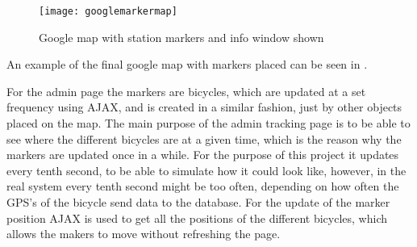 \begin{figure}[h]
	\centering
	\texttt{[image: googlemarkermap]}
	\caption{Google map with station markers and info window shown}
	\label{fig:googlemapmarkerinfowindow}
\end{figure}

An example of the final google map with markers placed can be seen in .

For the admin page the markers are bicycles, which are updated at a set frequency using AJAX, and is created in a similar fashion, just by other objects placed on the map.
The main purpose of the admin tracking page is to be able to see where the different bicycles are at a given time, which is the reason why the markers are updated once in a while.
For the purpose of this project it updates every tenth second, to be able to simulate how it could look like, however, in the real system every tenth second might be too often, depending on how often the GPS's of the bicycle send data to the database.
For the update of the marker position AJAX is used to get all the positions of the different bicycles, which allows the makers to move without refreshing the page.